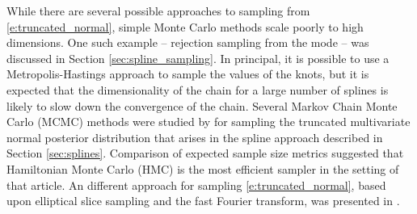 While there are several possible approaches to sampling from \eqref{e:truncated_normal}, simple Monte Carlo methods scale poorly to high dimensions. One such example -- rejection sampling from the mode -- was discussed in Section \eqref{sec:spline_sampling}. 
In principal, it is possible to use a Metropolis-Hastings approach to sample the values of the knots, but it is expected that the dimensionality of the chain for a large number of splines is likely to slow down the convergence of the chain.
Several Markov Chain Monte Carlo (MCMC) methods were studied by  for sampling the truncated multivariate normal posterior distribution that arises in the spline approach described in Section \ref{sec:splines}. 
Comparison of expected sample size metrics suggested that Hamiltonian Monte Carlo (HMC) is the most efficient sampler in the setting of that article.  An different approach for sampling \eqref{e:truncated_normal}, based upon elliptical slice sampling and the fast Fourier transform, was presented in .

